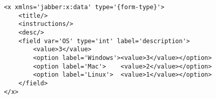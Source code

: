 \vspace{1\baselineskip}
\begin{lstlisting}
    <x xmlns='jabber:x:data' type='{form-type}'>
        <title/>
        <instructions/>
        <desc/>
        <field var='OS' type='int' label='description'>
            <value>3</value>
            <option label='Windows'><value>3</value></option>
            <option label='Mac'>    <value>2</value></option>
            <option label='Linux'>  <value>1</value></option>
        </field>
    </x>
\end{lstlisting}

